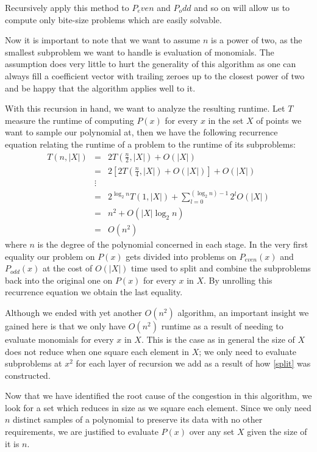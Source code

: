 \documentclass[12pt]{article}
\begin{document}
Recursively apply this method to $P_even$ and $P_odd$ and so on will allow us to compute only bite-size problems which are easily solvable.

Now it is important to note that we want to assume $n$ is a power of two, as the smallest subproblem we want to handle is evaluation of monomials. The assumption does very little to hurt the generality of this algorithm as one can always fill a coefficient vector with trailing zeroes up to the closest power of two and be happy that the algorithm applies well to it. 

With this recursion in hand, we want to analyze the resulting runtime. Let $T$ measure the runtime of computing $P(x)$ for every $x$ in the set $X$ of points we want to sample our polynomial at, then we have the following recurrence equation relating the runtime of a problem to the runtime of its subproblems:
\begin{eqnarray*} \label{recurrence}
	T(n,|X|) &=& 2T(\frac{n}{2}, |X|) + O(|X|)\\
	&=& 2\left[2T(\frac{n}{4}, |X|)+O(|X|)\right]+O(|X|)\\
	&\vdots&\\
	&=& 2^{\log_2{n}}T(1,|X|)+\sum_{l=0}^{(\log_2{n})-1}2^lO(|X|)\\
	&=& n^2+O(|X|\log_2{n})\\
	&=& O(n^2)
\end{eqnarray*}
where $n$ is the degree of the polynomial concerned in each stage. In the very first equality our problem on $P(x)$ gets divided into problems on $P_{even}(x)$ and $P_{odd}(x)$ at the cost of $O(|X|)$ time used to split and combine the subproblems back into the original one on $P(x)$ for every $x$ in $X$. By unrolling this recurrence equation we obtain the last equality.

Although we ended with yet another $O(n^2)$ algorithm, an important insight we gained here is that we only have $O(n^2)$ runtime as a result of needing to evaluate monomials for every $x$ in $X$. This is the case as in general the size of $X$ does not reduce when one square each element in $X$; we only need to evaluate subproblems at $x^2$ for each layer of recursion we add as a result of how \eqref{split} was constructed.

Now that we have identified the root cause of the congestion in this algorithm, we look for a set which reduces in size as we square each element. Since we only need $n$ distinct samples of a polynomial to preserve its data with no other requirements, we are justified to evaluate $P(x)$ over any set $X$ given the size of it is $n$. 
\end{document}
